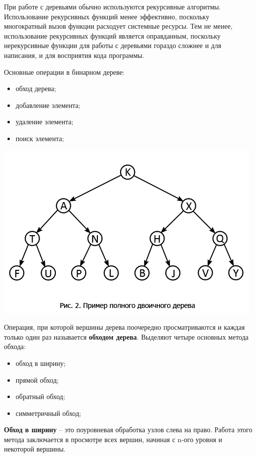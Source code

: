 При работе с деревьями обычно используются рекурсивные алгоритмы. Использование рекурсивных функций менее эффективно, поскольку многократный вызов функции расходует системные ресурсы. Тем не менее, использование рекурсивных функций является оправданным, поскольку нерекурсивные функции для работы с деревьями гораздо сложнее и для написания, и для восприятия кода программы.

Основные операции в бинарном дереве:

\begin{itemize}
\item обход дерева;
\item добавление элемента;
\item удаление элемента;
\item поиск элемента;
\end{itemize}

\begin{center}\includegraphics{2.png}\end{center}

Операция, при которой вершины дерева поочередно просматриваются и каждая только один раз называется {\bf обходом дерева}. Выделяют четыре основных метода обхода:

\begin{itemize}
\item обход в ширину;
\item прямой обход;
\item обратный обход;
\item симметричный обход;
\end{itemize}

{\bf Обход в ширину} – это поуровневая обработка узлов слева на право. Работа этого метода заключается в просмотре всех вершин, начиная с n-ого уровня и некоторой вершины.

